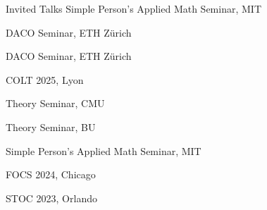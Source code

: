 
\begin{rubric}{Invited Talks}
   \entry*[Feb 2026] Simple Person's Applied Math Seminar, MIT
       
   \entry*[Nov 2025] DACO Seminar, ETH Z\"{u}rich


   \entry*[Jul 2025] DACO Seminar, ETH Z\"{u}rich

    COLT 2025, Lyon

   \entry*[Apr 2025] Theory Seminar, CMU

   \entry*[Mar 2025] Theory Seminar, BU

   \entry*[Nov 2024] Simple Person's Applied Math Seminar, MIT

   \entry*[Oct 2024] FOCS 2024, Chicago

   \entry*[Jun 2023] STOC 2023, Orlando

\end{rubric}